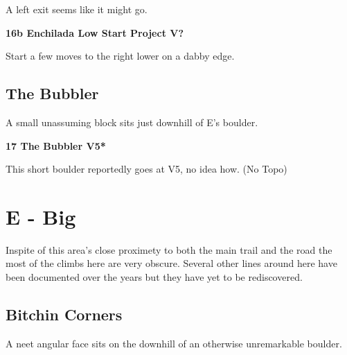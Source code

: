 \begin{multicols}{2}
\begin{adjustwidth}{0.5cm}{}
					\begin{adjustwidth}{0.5cm}{}			
					A left exit seems like it might go.
					\end{adjustwidth}
					
					
					
					\needspace{1.5cm}
\label{vr:Enchilada Low Start Project}
\colorbox{black!20}{
\parbox{0.95\linewidth}{
\textbf{
16b Enchilada Low Start Project V?  
}}}

					\begin{adjustwidth}{0.5cm}{}			
					Start a few moves to the right lower on a dabby edge.
					\end{adjustwidth}
					
					
				\end{adjustwidth}
			
		
		
		\needspace{1.5cm}
		\subsection*{The Bubbler}\label{bf:The Bubbler}
		A small unassuming block sits just downhill of E's boulder.\\
	
		
			
			\needspace{1.5cm}
\label{rt:The Bubbler}
\colorbox{RoyalBlue!20}{
\parbox{0.95\linewidth}{
\textbf{
17 The Bubbler V5*  
}}}

			\begin{adjustwidth}{0.5cm}{}			
			This short boulder reportedly goes at V5, no idea how. (No Topo)
			\end{adjustwidth}
			
			
		
	
\newpage


		\section{E - Big}\label{sa:Big}
	Inspite of this area's close proximety to both the main trail and the road the most of the climbs here are very obscure. Several other lines around here have been documented over the years but they have yet to be rediscovered.\\

	
	


		\needspace{1.5cm}
		\subsection*{Bitchin Corners}\label{bf:Bitchin Corners}
		A neet angular face sits on the downhill of an otherwise unremarkable boulder.\\
	

\end{multicols}
